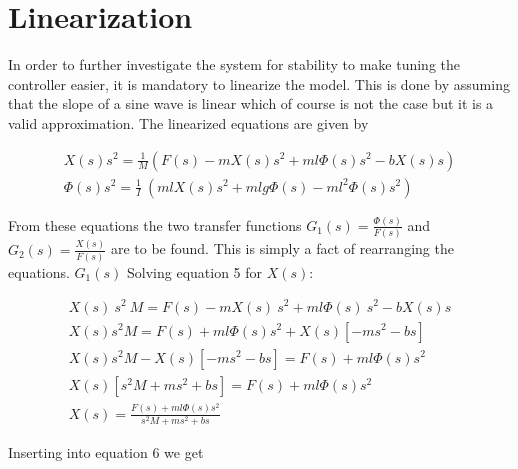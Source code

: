 \section{Linearization}
In order to further investigate the system for stability to make tuning the controller easier, it is mandatory to linearize the model. This is done by assuming that the slope of a sine wave is linear which of course is not the case but it is a valid approximation. The linearized equations are given by

	\begin{eqnarray}
		X\left(s\right)s^2=\frac{1}{M}\left(F\left(s\right)-mX\left(s\right)s^2+ml\Phi\left(s\right)s^2-bX\left(s\right)s\right)\\
		\Phi\left(s\right)s^2=\frac{1}{I}\ \left(mlX\left(s\right)s^2+mlg\Phi\left(s\right)-ml^2\Phi\left(s\right)s^2\right)
	\end{eqnarray}

From these equations the two transfer functions $G_1\left(s\right)=\frac{\Phi\left(s\right)}{F\left(s\right)}$ and $G_2\left(s\right)=\frac{X\left(s\right)}{F\left(s\right)}$ are to be found. This is simply a fact of rearranging the equations. \textbf{$G_1(s)$}
Solving equation 5 for $X(s)$:

\begin{eqnarray}
	X(s)\ s^2\ M=F(s)-mX(s)\ s^2+ml\Phi(s)\ s^2-bX(s)s \\
	X\left(s\right)s^2M=F\left(s\right)+ml\Phi\left(s\right)s^2+X\left(s\right)\left[-ms^2-bs\right] \\
	X\left(s\right)s^2M-X\left(s\right)\left[-ms^2-bs\right]=F\left(s\right)+ml\Phi\left(s\right)s^2 \\
	X\left(s\right)\left[s^2M+ms^2+bs\right]=F\left(s\right)+ml\Phi\left(s\right)s^2\\
	X\left(s\right)=\frac{F\left(s\right)+ml\Phi\left(s\right)s^2}{s^2M+ms^2+bs}
\end{eqnarray}

Inserting into equation 6 we get

